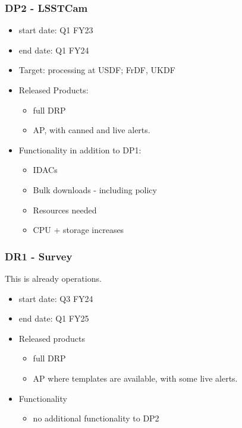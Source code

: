 \subsubsection{DP2 - LSSTCam}
\begin{itemize}
\item start date: Q1 \gls{FY23}
\item end date: Q1 \gls{FY24}
\item Target: processing at \gls{USDF}; FrDF, UKDF
\item Released Products:
\begin{itemize}
\item full \gls{DRP}
\item \gls{AP}, with canned and live alerts.
\end{itemize}
\item Functionality in addition to \gls{DP1}:
\begin{itemize}
\item IDACs
\item Bulk downloads - including policy
\item Resources needed
\item \gls{CPU} + storage increases
\end{itemize}
\end{itemize}
\subsubsection{DR1 - Survey}
This is already operations.

\begin{itemize}
\item start date: Q3 \gls{FY24}
\item end date: Q1 \gls{FY25}
\item Released products
\begin{itemize}
\item full \gls{DRP}
\item \gls{AP} where templates are available, with some live alerts.
\end{itemize}
\item Functionality
\begin{itemize}
\item no additional functionality to \gls{DP2}
\end{itemize}
\end{itemize}
